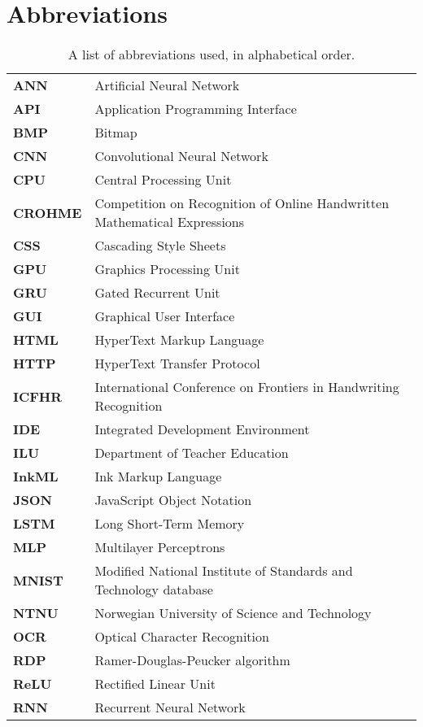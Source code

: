 \section{Abbreviations}
\begin{table}[H]
\begin{tabular}{ l l }
\textbf{ANN} & Artificial Neural Network \\
\textbf{API} & Application Programming Interface \\
\textbf{BMP} & Bitmap \\
\textbf{CNN} & Convolutional Neural Network \\
\textbf{CPU} & Central Processing Unit \\
\textbf{CROHME} & Competition on Recognition of Online Handwritten Mathematical Expressions\\
\textbf{CSS} & Cascading Style Sheets \\
\textbf{GPU} & Graphics Processing Unit \\
\textbf{GRU} & Gated Recurrent Unit \\
\textbf{GUI} & Graphical User Interface \\
\textbf{HTML} & HyperText Markup Language \\
\textbf{HTTP} & HyperText Transfer Protocol \\
\textbf{ICFHR} & International Conference on Frontiers in Handwriting Recognition \\
\textbf{IDE} & Integrated Development Environment \\
\textbf{ILU} & Department of Teacher Education \\
\textbf{InkML} & Ink Markup Language \\
\textbf{JSON} & JavaScript Object Notation \\
\textbf{LSTM} & Long Short-Term Memory \\
\textbf{MLP} & Multilayer Perceptrons \\
\textbf{MNIST} & Modified National Institute of Standards and Technology database \\
\textbf{NTNU} & Norwegian University of Science and Technology \\
\textbf{OCR} & Optical Character Recognition \\
\textbf{RDP} & Ramer-Douglas-Peucker algorithm \\
\textbf{ReLU} & Rectified Linear Unit \\
\textbf{RNN} & Recurrent Neural Network \\

\end{tabular}
\label{table:abbreviations}
\caption{A list of abbreviations used, in alphabetical order.}
\end{table}